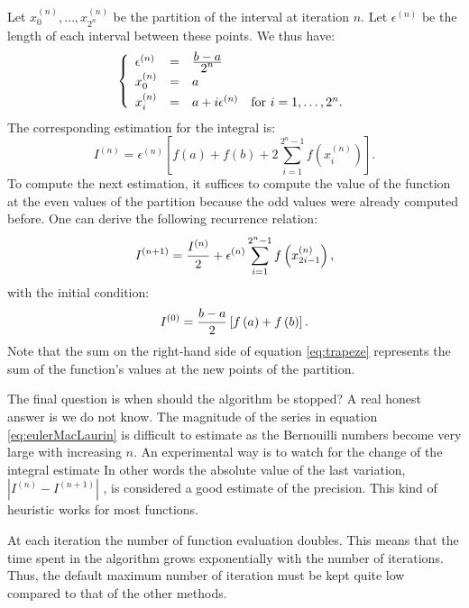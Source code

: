 Let $x_0^{\left(n\right)},\ldots,x_{2^n}^{\left(n\right)}$ be the
partition of the interval at iteration $n$. Let
$\epsilon^{\left(n\right)}$ be the length of each interval between
these points. We thus have:
\begin{equation}
  \left\{
  \begin{array}{lcl}
    \epsilon^{\left(n\right)} & = & {\displaystyle b-a \over\displaystyle 2^n} \\
    x_0^{\left(n\right)} & = & a \\*[0.5ex]
    x_i^{\left(n\right)} & = & a+i\epsilon^{\left(n\right)}
    \mbox{\quad for $i=1,\ldots,2^n$.}
  \end{array}
  \right.
\end{equation}
The corresponding estimation for the integral is:
\begin{equation}
\label{eq:trapezesum}I^{\left(n\right)}=\epsilon^{\left(n\right)}\left[f\left(a\right)+f\left(b\right)+2
\sum_{i=1}^{2^n-1}f\left(x_i^{\left(n\right)}\right)\right] .
\end{equation}
To compute the next estimation, it suffices to compute the value
of the function at the even values of the partition because the
odd values were already computed before. One can derive the
following recurrence relation:
\begin{equation}
\label{eq:trapeze} I^{\left(n+1\right)}={I^{\left(n\right)}\over
2}+ \epsilon^{\left(n\right)}
\sum_{i=1}^{2^n-1}f\left(x_{2i-1}^{\left(n\right)}\right),
\end{equation}
with the initial condition:
\begin{equation}
I^{\left(0\right)}={b-a \over
2}\left[f\left(a\right)+f\left(b\right)\right].
\end{equation}
Note that the sum on the right-hand side of equation
\ref{eq:trapeze} represents the sum of the function's values at
the new points of the partition.

 The final question is when should the
algorithm be stopped? A real honest answer is we do not know. The
magnitude of the series in equation \ref{eq:eulerMacLaurin} is
difficult to estimate as the Bernouilli numbers become very large
with increasing $n$. An experimental way is to watch for the
change of the integral estimate In other words the absolute value
of the last variation,
$\left|I^{\left(n\right)}-I^{\left(n+1\right)}\right|$ , is
considered a good estimate of the precision. This kind of
heuristic works for most functions.

At each iteration the number of function evaluation doubles. This
means that the time spent in the algorithm grows exponentially
with the number of iterations. Thus, the default maximum number of
iteration must be kept quite low compared to that of the other
methods.


